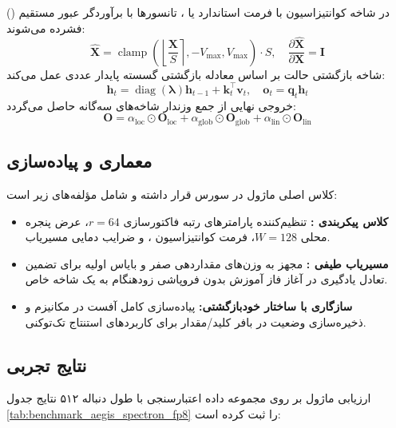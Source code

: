 در شاخه کوانتیزاسیون  با فرمت استاندارد  یا ، تانسورها با برآوردگر عبور مستقیم () فشرده می‌شوند:
\begin{equation}
\hat{\mathbf{X}} = \operatorname{clamp}\left( \left\lfloor \frac{\mathbf{X}}{S} \right\rceil, -V_{\max}, V_{\max} \right) \cdot S, \quad \frac{\partial \hat{\mathbf{X}}}{\partial \mathbf{X}} = \mathbf{I}
\end{equation}
شاخه بازگشتی حالت بر اساس معادله بازگشتی گسسته پایدار عددی عمل می‌کند:
\begin{equation}
\mathbf{h}_t = \operatorname{diag}(\boldsymbol{\lambda}) \mathbf{h}_{t-1} + \mathbf{k}_t^\top \mathbf{v}_t, \quad \mathbf{o}_t = \mathbf{q}_t \mathbf{h}_t
\end{equation}
خروجی نهایی از جمع وزندار شاخه‌های سه‌گانه حاصل می‌گردد:
\begin{equation}
\mathbf{O} = \alpha_{\text{loc}} \odot \mathbf{O}_{\text{loc}} + \alpha_{\text{glob}} \odot \mathbf{O}_{\text{glob}} + \alpha_{\text{lin}} \odot \mathbf{O}_{\text{lin}}
\end{equation}

\subsection{معماری و پیاده‌سازی}
کلاس اصلی ماژول  در سورس  قرار داشته و شامل مؤلفه‌های زیر است:
\begin{itemize}
    \item \textbf{کلاس پیکربندی :} تنظیم‌کننده پارامترهای رتبه فاکتورسازی $r=64$، عرض پنجره محلی $W=128$، فرمت کوانتیزاسیون ، و ضرایب دمایی مسیریاب.
    \item \textbf{مسیریاب طیفی :} مجهز به وزن‌های مقداردهی صفر و بایاس اولیه برای تضمین تعادل یادگیری در آغاز فاز آموزش بدون فروپاشی زودهنگام به یک شاخه خاص.
    \item \textbf{سازگاری با ساختار خودبازگشتی:} پیاده‌سازی کامل آفست  در مکانیزم  و ذخیره‌سازی وضعیت در بافر کلید/مقدار برای کاربردهای استنتاج تک‌توکنی.
\end{itemize}

\subsection{نتایج تجربی}
ارزیابی ماژول  بر روی مجموعه داده اعتبارسنجی  با طول دنباله ۵۱۲ نتایج جدول \ref{tab:benchmark_aegis_spectron_fp8} را ثبت کرده است:

